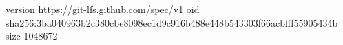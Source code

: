 version https://git-lfs.github.com/spec/v1
oid sha256:3ba040963b2c380cbe8098ec1d9c916b488e448b543303f66acbfff55905434b
size 1048672

